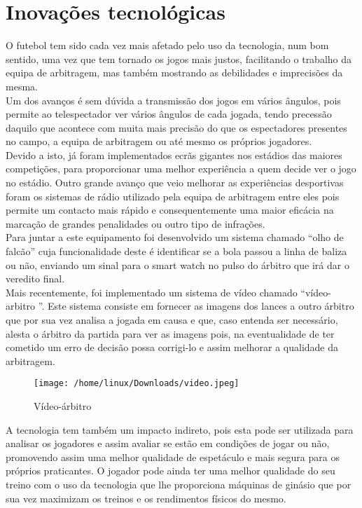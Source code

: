 \documentclass[a4paper,12pt]{report}
\begin{document}
\chapter{Inovações tecnológicas}
\label{Inovações tecnológicas}

O futebol tem sido cada vez mais afetado pelo uso da tecnologia, num bom sentido, uma vez que tem tornado os jogos mais justos, facilitando o trabalho da equipa de arbitragem, mas também mostrando as debilidades e imprecisões da mesma. \\
Um dos avanços é sem dúvida a transmissão dos jogos em vários ângulos, pois permite ao telespectador ver vários ângulos de cada jogada, tendo precessão daquilo que acontece com muita mais precisão do que os espectadores presentes no campo, a equipa de arbitragem ou até mesmo os próprios jogadores. \\
 Devido a isto, já foram implementados ecrãs gigantes nos estádios das maiores competições, para proporcionar uma melhor experiência a quem decide ver o jogo no estádio. Outro grande avanço que veio melhorar as experiências desportivas foram os sistemas de rádio utilizado pela equipa de arbitragem entre eles pois permite um contacto mais rápido e consequentemente uma maior eficácia na marcação de grandes penalidades ou outro tipo de infrações.  \\
 Para juntar a este equipamento foi desenvolvido um sistema chamado “olho de falcão” cuja funcionalidade deste é identificar se a bola passou a linha de baliza ou não, enviando um sinal para o smart watch no pulso do árbitro que irá dar o veredito final. \\
Mais recentemente, foi implementado um sistema de vídeo chamado “vídeo-arbitro ”. Este sistema consiste em fornecer as imagens dos lances a outro árbitro que por sua vez analisa a jogada em causa e que, caso entenda ser necessário, alesta o árbitro da partida para ver as imagens pois, na eventualidade de ter cometido um erro de decisão possa corrigi-lo e assim melhorar a qualidade da arbitragem. \\

\begin{figure}[!htp]
\centering 
\texttt{[image: /home/linux/Downloads/video.jpeg]}
\caption{Vídeo-árbitro}
\end{figure} 
\newpage
A tecnologia tem também um impacto indireto, pois esta pode ser utilizada para analisar os jogadores e assim avaliar se estão em condições de jogar ou não, promovendo assim uma melhor qualidade de espetáculo e mais segura para os próprios praticantes. O jogador pode ainda ter uma melhor qualidade do seu treino com o uso da tecnologia que lhe proporciona máquinas de ginásio que por sua vez maximizam os treinos e os rendimentos físicos do mesmo. \\
\end{document}
